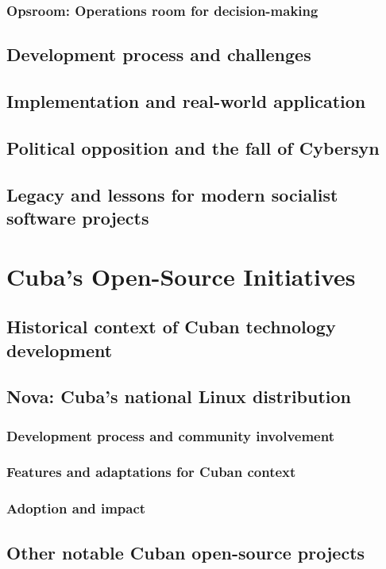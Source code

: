 \subsubsection{Opsroom: Operations room for decision-making}
\subsection{Development process and challenges}
\subsection{Implementation and real-world application}
\subsection{Political opposition and the fall of Cybersyn}
\subsection{Legacy and lessons for modern socialist software projects}

\newpage

\section{Cuba's Open-Source Initiatives}
\subsection{Historical context of Cuban technology development}
\subsection{Nova: Cuba's national Linux distribution}
\subsubsection{Development process and community involvement}
\subsubsection{Features and adaptations for Cuban context}
\subsubsection{Adoption and impact}
\subsection{Other notable Cuban open-source projects}
